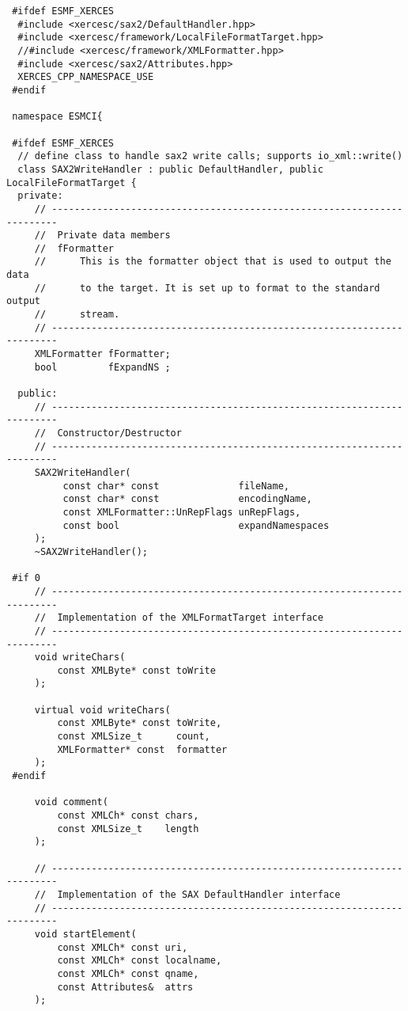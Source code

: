 \begin{verbatim} #ifdef ESMF_XERCES
  #include <xercesc/sax2/DefaultHandler.hpp>
  #include <xercesc/framework/LocalFileFormatTarget.hpp>
  //#include <xercesc/framework/XMLFormatter.hpp>
  #include <xercesc/sax2/Attributes.hpp>
  XERCES_CPP_NAMESPACE_USE
 #endif
 
 namespace ESMCI{
 
 #ifdef ESMF_XERCES
  // define class to handle sax2 write calls; supports io_xml::write()
  class SAX2WriteHandler : public DefaultHandler, public LocalFileFormatTarget {
  private:
     // -----------------------------------------------------------------------
     //  Private data members
     //  fFormatter
     //      This is the formatter object that is used to output the data
     //      to the target. It is set up to format to the standard output
     //      stream.
     // -----------------------------------------------------------------------
     XMLFormatter fFormatter;
     bool         fExpandNS ;
 
  public:
     // -----------------------------------------------------------------------
     //  Constructor/Destructor
     // -----------------------------------------------------------------------
     SAX2WriteHandler(
          const char* const              fileName,
          const char* const              encodingName,
          const XMLFormatter::UnRepFlags unRepFlags,
          const bool                     expandNamespaces
     );
     ~SAX2WriteHandler();
 
 #if 0
     // -----------------------------------------------------------------------
     //  Implementation of the XMLFormatTarget interface
     // -----------------------------------------------------------------------
     void writeChars(
         const XMLByte* const toWrite
     );
 
     virtual void writeChars(
         const XMLByte* const toWrite,
         const XMLSize_t      count,
         XMLFormatter* const  formatter
     );
 #endif
 
     void comment(
         const XMLCh* const chars,
         const XMLSize_t    length
     );
 
     // -----------------------------------------------------------------------
     //  Implementation of the SAX DefaultHandler interface
     // -----------------------------------------------------------------------
     void startElement(
         const XMLCh* const uri,
         const XMLCh* const localname,
         const XMLCh* const qname,
         const Attributes&  attrs
     );
 

\end{verbatim}
